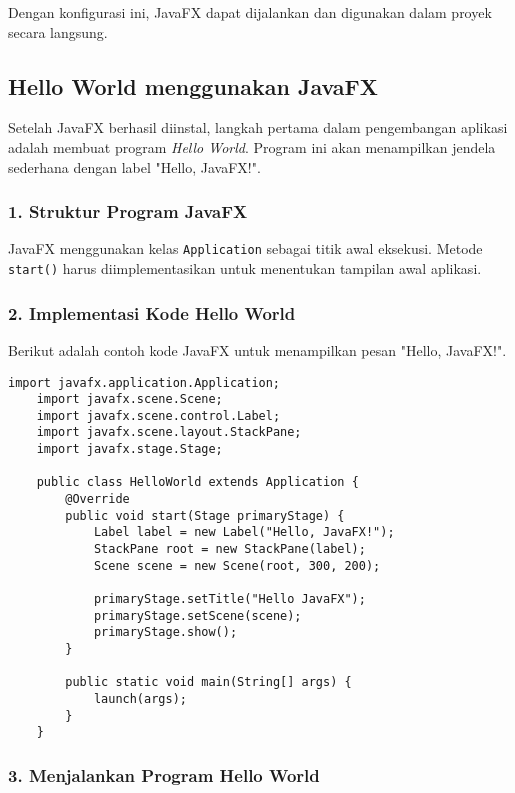 Dengan konfigurasi ini, JavaFX dapat dijalankan dan digunakan dalam proyek secara langsung.


\subsection{Hello World menggunakan JavaFX}
\label{hello_world_menggunakan_javafx}

Setelah JavaFX berhasil diinstal, langkah pertama dalam pengembangan aplikasi adalah membuat program \textit{Hello World}. Program ini akan menampilkan jendela sederhana dengan label "Hello, JavaFX!".

\subsubsection{1. Struktur Program JavaFX}

JavaFX menggunakan kelas \texttt{Application} sebagai titik awal eksekusi. Metode \texttt{start()} harus diimplementasikan untuk menentukan tampilan awal aplikasi.

\subsubsection{2. Implementasi Kode Hello World}

Berikut adalah contoh kode JavaFX untuk menampilkan pesan "Hello, JavaFX!".

\begin{lstlisting}[style=JavaStyle, caption=Program Hello World menggunakan JavaFX]
	import javafx.application.Application;
	import javafx.scene.Scene;
	import javafx.scene.control.Label;
	import javafx.scene.layout.StackPane;
	import javafx.stage.Stage;
	
	public class HelloWorld extends Application {
		@Override
		public void start(Stage primaryStage) {
			Label label = new Label("Hello, JavaFX!");
			StackPane root = new StackPane(label);
			Scene scene = new Scene(root, 300, 200);
			
			primaryStage.setTitle("Hello JavaFX");
			primaryStage.setScene(scene);
			primaryStage.show();
		}
		
		public static void main(String[] args) {
			launch(args);
		}
	}
\end{lstlisting}

\subsubsection{3. Menjalankan Program Hello World}


